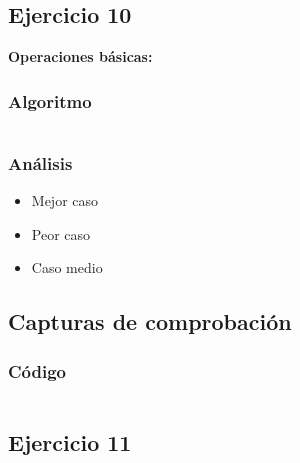 \documentclass[12pt, letterpaper]{article}			%
\begin{document}
	    \subsection{Ejercicio 10}	 

	    \textbf{Operaciones básicas:}
			\subsubsection{Algoritmo}
			    \begin{lstlisting}[style=Java]
    		    \end{lstlisting}

    		\subsubsection{Análisis}
	    		\begin{itemize}
	    			\item[\Checklist] Mejor caso \\

	    			\item[\Checklist] Peor caso \\
					
					\item[\Checklist] Caso medio \\

				\end{itemize}
	        \subsection{Capturas de comprobación}

	        \subsubsection{Código}
	            \begin{lstlisting}[style=Java]
    		    \end{lstlisting}

	    \subsection{Ejercicio 11}
\end{document}
